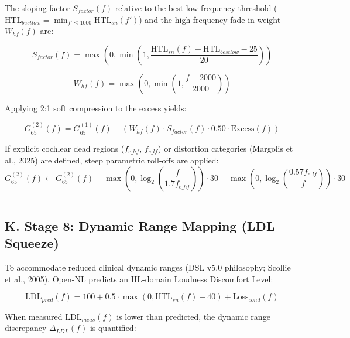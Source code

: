 \documentclass[
]{article}
\begin{document}
The sloping factor \(S_{factor}(f)\) relative to the best low-frequency
threshold
(\(\text{HTL}_{bestlow} = \min_{f' \le 1000} \text{HTL}_{sn}(f')\)) and
the high-frequency fade-in weight \(W_{hf}(f)\) are:

\begin{equation}
S_{factor}(f) = \max\left(0, \min\left(1, \frac{\text{HTL}_{sn}(f) - \text{HTL}_{bestlow} - 25}{20}\right)\right)
\end{equation}

\begin{equation}
W_{hf}(f) = \max\left(0, \min\left(1, \frac{f - 2000}{2000}\right)\right)
\end{equation}

Applying 2:1 soft compression to the excess yields:

\begin{equation}
G_{65}^{(2)}(f) = G_{65}^{(1)}(f) - \left(W_{hf}(f) \cdot S_{factor}(f) \cdot 0.50 \cdot \text{Excess}(f)\right)
\end{equation}

If explicit cochlear dead regions (\(f_{e\_hf}\), \(f_{e\_lf}\)) or
distortion categories (Margolis et al., 2025) are defined, steep
parametric roll-offs are applied: \begin{equation}
G_{65}^{(2)}(f) \leftarrow G_{65}^{(2)}(f) - \max\left(0, \log_2\left(\frac{f}{1.7 f_{e\_hf}}\right)\right) \cdot 30 - \max\left(0, \log_2\left(\frac{0.57 f_{e\_lf}}{f}\right)\right) \cdot 30
\end{equation}

\begin{center}\rule{0.5\linewidth}{0.5pt}\end{center}

\subsection{K. Stage 8: Dynamic Range Mapping (LDL
Squeeze)}\label{k.-stage-8-dynamic-range-mapping-ldl-squeeze}

To accommodate reduced clinical dynamic ranges (DSL v5.0 philosophy;
Scollie et al., 2005), Open-NL predicts an HL-domain Loudness Discomfort
Level:

\begin{equation}
\text{LDL}_{pred}(f) = 100 + 0.5 \cdot \max\left(0, \text{HTL}_{sn}(f) - 40\right) + \text{Loss}_{cond}(f)
\end{equation}

When measured \(\text{LDL}_{meas}(f)\) is lower than predicted, the
dynamic range discrepancy \(\Delta_{LDL}(f)\) is quantified:
\end{document}
